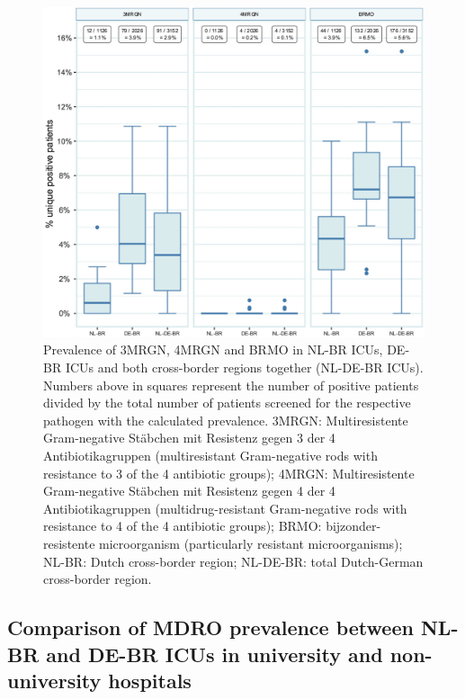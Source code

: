 \documentclass[
]{book}
\begin{document}
\begin{figure}

{\centering \includegraphics[width=1\linewidth]{images/10-03} 

}

\caption{Prevalence of 3MRGN, 4MRGN and BRMO in NL-BR ICUs, DE-BR ICUs and both cross-border regions together (NL-DE-BR ICUs). Numbers above in squares represent the number of positive patients divided by the total number of patients screened for the respective pathogen with the calculated prevalence. 3MRGN: Multiresistente Gram-negative Stäbchen mit Resistenz gegen 3 der 4 Antibiotikagruppen (multiresistant Gram-negative rods with resistance to 3 of the 4 antibiotic groups); 4MRGN: Multiresistente Gram-negative Stäbchen mit Resistenz gegen 4 der 4 Antibiotikagruppen (multidrug-resistant Gram-negative rods with resistance to 4 of the 4 antibiotic groups); BRMO: bijzonder-resistente microorganism (particularly resistant microorganisms); NL-BR: Dutch cross-border region; NL-DE-BR: total Dutch-German cross-border region.}\label{fig:fig10-3}
\end{figure}

\hypertarget{comparison-of-mdro-prevalence-between-nl-br-and-de-br-icus-in-university-and-non-university-hospitals}{%
\subsection{Comparison of MDRO prevalence between NL-BR and DE-BR ICUs in university and non-university hospitals}\label{comparison-of-mdro-prevalence-between-nl-br-and-de-br-icus-in-university-and-non-university-hospitals}}
\end{document}
